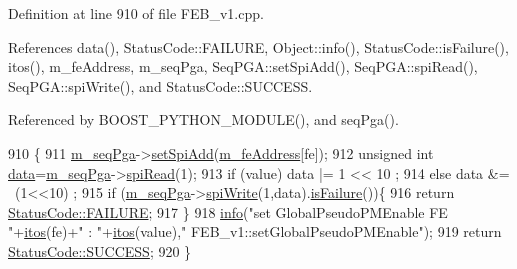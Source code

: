 Definition at line 910 of file F\+E\+B\+\_\+v1.\+cpp.



References data(), Status\+Code\+::\+F\+A\+I\+L\+U\+RE, Object\+::info(), Status\+Code\+::is\+Failure(), itos(), m\+\_\+fe\+Address, m\+\_\+seq\+Pga, Seq\+P\+G\+A\+::set\+Spi\+Add(), Seq\+P\+G\+A\+::spi\+Read(), Seq\+P\+G\+A\+::spi\+Write(), and Status\+Code\+::\+S\+U\+C\+C\+E\+SS.



Referenced by B\+O\+O\+S\+T\+\_\+\+P\+Y\+T\+H\+O\+N\+\_\+\+M\+O\+D\+U\+L\+E(), and seq\+Pga().


\begin{DoxyCode}
910                                                               \{
911   \hyperlink{classFEB__v1_a6c7804ac86796f233a8393043adf2e77}{m\_seqPga}->\hyperlink{classSeqPGA_ac998ce3a6d9b5f2e88cc8393f8c1df53}{setSpiAdd}(\hyperlink{classFEB__v1_a4e1945c2d5b434125f375e9d0fc6d99f}{m\_feAddress}[fe]);
912   \textcolor{keywordtype}{unsigned} \textcolor{keywordtype}{int} \hyperlink{classFEB__v1_a6bca4320bd3bbbc32efc81097f33421a}{data}=\hyperlink{classFEB__v1_a6c7804ac86796f233a8393043adf2e77}{m\_seqPga}->\hyperlink{classSeqPGA_ab3d0e5e5d4014bc7a92588a76b8713d4}{spiRead}(1);
913   \textcolor{keywordflow}{if} (value)  data |= 1 << 10 ;
914   \textcolor{keywordflow}{else}        data &= ~(1<<10) ;
915   \textcolor{keywordflow}{if} (\hyperlink{classFEB__v1_a6c7804ac86796f233a8393043adf2e77}{m\_seqPga}->\hyperlink{classSeqPGA_ad4421841ce4ce8b88ad13f63216f0743}{spiWrite}(1,data).\hyperlink{classStatusCode_a5dd22dc6eb2c52fc4cabc58f6dea2eb7}{isFailure}())\{
916     \textcolor{keywordflow}{return} \hyperlink{classStatusCode_a6f565cbeadc76d14c72f047e5e85eb4ba3da73d4c469762eb9d3c960368252b26}{StatusCode::FAILURE};
917   \}
918   \hyperlink{classObject_a644fd329ea4cb85f54fa6846484b84a8}{info}(\textcolor{stringliteral}{"set GlobalPseudoPMEnable FE "}+\hyperlink{Tools_8h_af330027dbdafb9a30768b3613c553e60}{itos}(fe)+\textcolor{stringliteral}{" : "}+\hyperlink{Tools_8h_af330027dbdafb9a30768b3613c553e60}{itos}(value),\textcolor{stringliteral}{"
      FEB\_v1::setGlobalPseudoPMEnable"});
919   \textcolor{keywordflow}{return} \hyperlink{classStatusCode_a6f565cbeadc76d14c72f047e5e85eb4badd0da38d3ba0d922efd1f4619bc37ad8}{StatusCode::SUCCESS};
920 \}
\end{DoxyCode}
\mbox{\label{classFEB__v1_aea3983d847c7b8053485ddd16af65680}} 
